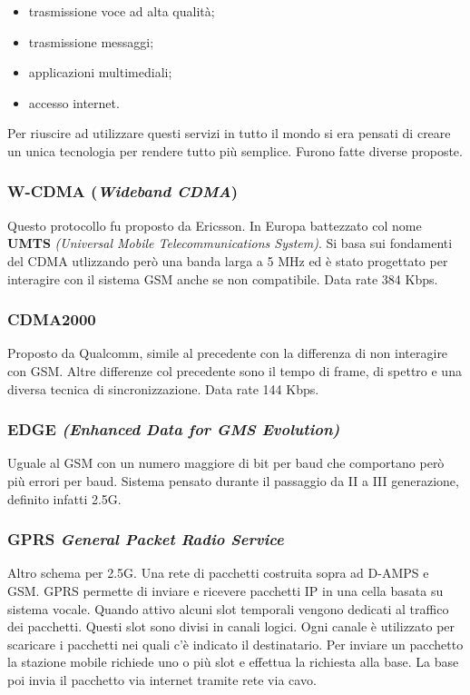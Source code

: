 \begin{itemize}

\item trasmissione voce ad alta qualità;
\item trasmissione messaggi;
\item applicazioni multimediali;
\item accesso internet.

\end{itemize}

Per riuscire ad utilizzare questi servizi in tutto il mondo si era pensati di creare un unica tecnologia per rendere tutto più semplice. Furono fatte diverse proposte.

\subsubsection*{W-CDMA (\textit{Wideband CDMA})}

Questo protocollo fu proposto da Ericsson. In Europa battezzato col nome \textbf{UMTS} \textit{(Universal Mobile Telecommunications System)}. Si basa sui fondamenti del CDMA utlizzando però una banda larga a 5 MHz ed è stato progettato per interagire con il sistema GSM anche se non compatibile. Data rate 384 Kbps.

\subsubsection*{CDMA2000}

Proposto da Qualcomm, simile al precedente con la differenza di non interagire con GSM. Altre differenze col precedente sono il tempo di frame, di spettro e una diversa tecnica di sincronizzazione. Data rate 144 Kbps.

\subsubsection*{EDGE \textit{(Enhanced Data for GMS Evolution)}}

Uguale al GSM con un numero maggiore di bit per baud che comportano però più errori per baud. Sistema pensato durante il passaggio da II a III generazione, definito infatti 2.5G.

\subsubsection*{GPRS \textit{General Packet Radio Service}}

Altro schema per 2.5G. Una rete di pacchetti costruita sopra ad D-AMPS e GSM. GPRS permette di inviare e ricevere pacchetti IP in una cella basata su sistema vocale. Quando attivo alcuni slot temporali vengono dedicati al traffico dei pacchetti. Questi slot sono divisi in canali logici. Ogni canale è utilizzato per scaricare i pacchetti nei quali c'è indicato il destinatario. Per inviare un pacchetto la stazione mobile richiede uno o più slot e effettua la richiesta alla base. La base poi invia il pacchetto via internet tramite rete via cavo.

